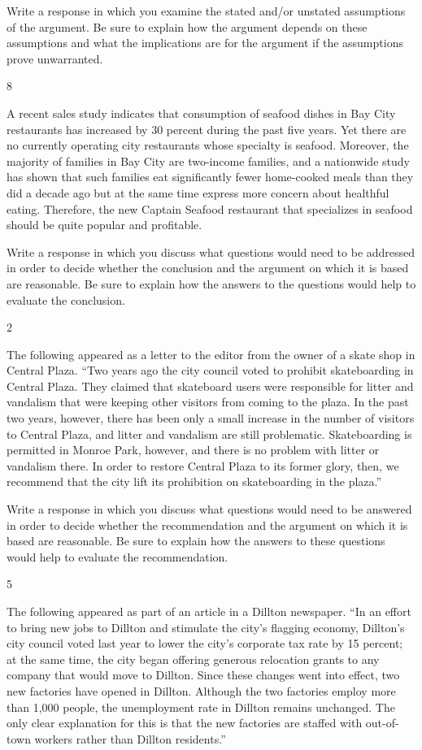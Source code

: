 \documentclass[]{article}
\begin{document}
Write a response in which you examine the stated and/or unstated
assumptions of the argument. Be sure to explain how the argument depends
on these assumptions and what the implications are for the argument if
the assumptions prove unwarranted.

8

A recent sales study indicates that consumption of seafood dishes in Bay
City restaurants has increased by 30 percent during the past five years.
Yet there are no currently operating city restaurants whose specialty is
seafood. Moreover, the majority of families in Bay City are two-income
families, and a nationwide study has shown that such families eat
significantly fewer home-cooked meals than they did a decade ago but at
the same time express more concern about healthful eating. Therefore,
the new Captain Seafood restaurant that specializes in seafood should be
quite popular and profitable.

Write a response in which you discuss what questions would need to be
addressed in order to decide whether the conclusion and the argument on
which it is based are reasonable. Be sure to explain how the answers to
the questions would help to evaluate the conclusion.

2

The following appeared as a letter to the editor from the owner of a
skate shop in Central Plaza. ``Two years ago the city council voted to
prohibit skateboarding in Central Plaza. They claimed that skateboard
users were responsible for litter and vandalism that were keeping other
visitors from coming to the plaza. In the past two years, however, there
has been only a small increase in the number of visitors to Central
Plaza, and litter and vandalism are still problematic. Skateboarding is
permitted in Monroe Park, however, and there is no problem with litter
or vandalism there. In order to restore Central Plaza to its former
glory, then, we recommend that the city lift its prohibition on
skateboarding in the plaza.''

Write a response in which you discuss what questions would need to be
answered in order to decide whether the recommendation and the argument
on which it is based are reasonable. Be sure to explain how the answers
to these questions would help to evaluate the recommendation.

5

The following appeared as part of an article in a Dillton newspaper.
``In an effort to bring new jobs to Dillton and stimulate the city's
flagging economy, Dillton's city council voted last year to lower the
city's corporate tax rate by 15 percent; at the same time, the city
began offering generous relocation grants to any company that would move
to Dillton. Since these changes went into effect, two new factories have
opened in Dillton. Although the two factories employ more than 1,000
people, the unemployment rate in Dillton remains unchanged. The only
clear explanation for this is that the new factories are staffed with
out-of-town workers rather than Dillton residents.''
\end{document}
